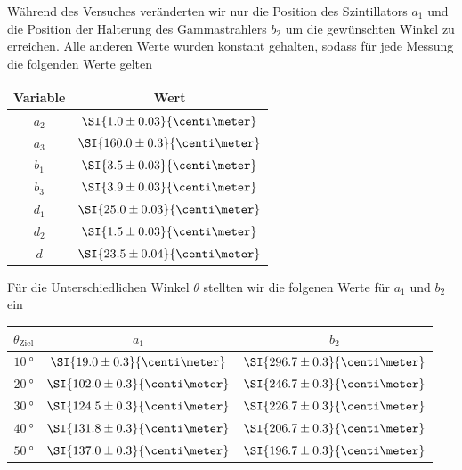Während des Versuches veränderten wir nur die Position des Szintillators $a_1$ und die Position der Halterung des Gammastrahlers $b_2$ um die gewünschten Winkel zu erreichen. Alle anderen Werte wurden konstant gehalten, sodass für jede Messung die folgenden Werte gelten
\begin{center}
    \begin{tabular}{|c|c|}
        \hline
        \textbf{Variable} & \textbf{Wert}\\
        \hline
        $a_2$ & $\SI{1.0 \pm 0.03}{\centi\meter}$ \\
        \hline
        $a_3$ & $\SI{160.0 \pm 0.3}{\centi\meter}$ \\
        \hline
        $b_1$ & $\SI{3.5 \pm 0.03}{\centi\meter}$ \\
        \hline
        $b_3$ & $\SI{3.9 \pm 0.03}{\centi\meter}$ \\
        \hline
        $d_1$ & $\SI{25.0 \pm 0.03}{\centi\meter}$ \\
        \hline
        $d_2$ & $\SI{1.5 \pm 0.03}{\centi\meter}$ \\
        \hline
        $d$ & $\SI{23.5 \pm 0.04}{\centi\meter}$ \\
        \hline
    \end{tabular}
\end{center}
Für die Unterschiedlichen Winkel $\theta$ stellten wir die folgenen Werte für $a_1$ und $b_2$ ein
\begin{center}
    \begin{tabular}{|c|c|c|}
        \hline
        $\theta_{\text{Ziel}}$ & $a_1$ & $b_2$ \\
        \hline
        $\SI{10}{\degree}$ & $\SI{19.0 \pm 0.3}{\centi\meter}$ & $\SI{296.7 \pm 0.3}{\centi\meter}$ \\
        \hline
        $\SI{20}{\degree}$ & $\SI{102.0 \pm 0.3}{\centi\meter}$ & $\SI{246.7 \pm 0.3}{\centi\meter}$ \\
        \hline
        $\SI{30}{\degree}$ & $\SI{124.5 \pm 0.3}{\centi\meter}$ & $\SI{226.7 \pm 0.3}{\centi\meter}$ \\
        \hline
        $\SI{40}{\degree}$ & $\SI{131.8 \pm 0.3}{\centi\meter}$ & $\SI{206.7 \pm 0.3}{\centi\meter}$ \\
        \hline
        $\SI{50}{\degree}$ & $\SI{137.0 \pm 0.3}{\centi\meter}$ & $\SI{196.7 \pm 0.3}{\centi\meter}$ \\
        \hline
    \end{tabular}
\end{center}
